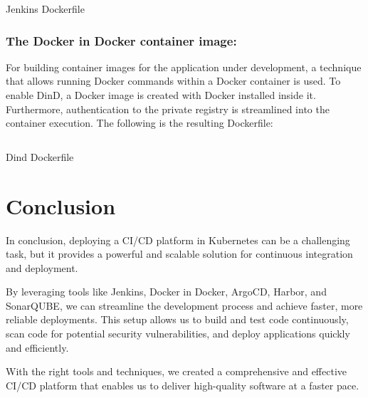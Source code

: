 \begin{listing}[H]
    \inputminted{Dockerfile}{codeListing/jenkins_Dockerfile}
    \caption{Jenkins Dockerfile}
    \label{lst:Jenkins Dockerfile}
\end{listing}

\subsubsection{The Docker in Docker container image: }

For building container images for the application under development, a technique that allows running Docker commands within a Docker container is used. To enable DinD, a Docker image is created with Docker installed inside it. Furthermore, authentication to the private registry is streamlined into the container execution. The following is the resulting Dockerfile: 

\begin{listing}[H]
    \inputminted{Dockerfile}{codeListing/dind-Dockerfile}
    \caption{Dind Dockerfile}
    \label{lst:Dind Dockerfile}
\end{listing}

\section*{Conclusion}
In conclusion, deploying a CI/CD platform in Kubernetes can be a challenging task, but it provides a powerful and scalable solution for continuous integration and deployment. 

By leveraging tools like Jenkins, Docker in Docker, ArgoCD, Harbor, and SonarQUBE, we can streamline the development process and achieve faster, more reliable deployments. This setup allows us to build and test code continuously, scan code for potential security vulnerabilities, and deploy applications quickly and efficiently. 

With the right tools and techniques, we created a comprehensive and effective CI/CD platform that enables us to deliver high-quality software at a faster pace.